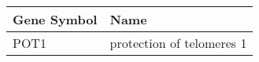 \begin{tabular}{ll}
\toprule
Gene Symbol &                      Name \\
\midrule
       POT1 & protection of telomeres 1 \\
\bottomrule
\end{tabular}
